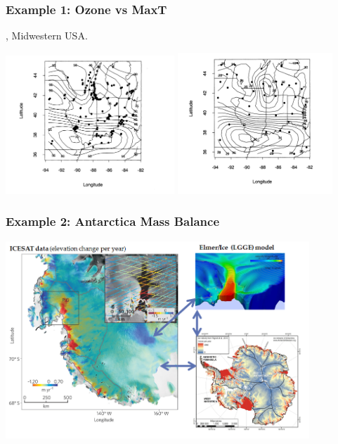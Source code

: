 \documentclass{beamer}
\begin{document}

\begin{frame}
\frametitle{Example 1: Ozone vs MaxT}

\cite{RoyleBerliner1999}, Midwestern USA.

\begin{center}
\includegraphics[width=2.5in]{./ozone.png}
\includegraphics[width=2.3in]{./maxt.png}
\end{center}
\end{frame}


\begin{frame}
\frametitle{Example 2: Antarctica Mass Balance}

\includegraphics[width=4.5in]{./Antarctica.png}
\end{frame}
\end{document}
